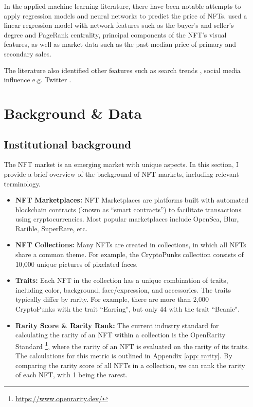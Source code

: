 \documentclass[12pt]{article}
\begin{document}
In the applied machine learning literature, there have been notable attempts to apply regression models and neural networks to predict the price of NFTs. \citet{nadini2021mapping} used a linear regression model with network features such as the buyer's and seller's degree and PageRank centrality, principal components of the NFT's visual features, as well as market data such as the past median price of primary and secondary sales.

The literature also identified other features such as search trends \citep{jain2022nft,kaneko2021time}, social media influence e.g. Twitter \citep{kapoor2022tweetboost}.


\section{Background \& Data}
\label{sec: data}

\subsection{Institutional background}
The NFT market is an emerging market with unique aspects. In this section, I provide a brief overview of the background of NFT markets, including relevant terminology.

\begin{itemize}

    \item \textbf{NFT Marketplaces:} NFT Marketplaces are platforms built with automated blockchain contracts (known as ``smart contracts'') to facilitate transactions using cryptocurrencies. Most popular marketplaces include OpenSea, Blur, Rarible, SuperRare, etc. 

    \item \textbf{NFT Collections:} Many NFTs are created in collections, in which all NFTs share a common theme. For example, the CryptoPunks collection consists of 10,000 unique pictures of pixelated faces. 

    \item \textbf{Traits:} Each NFT in the collection has a unique combination of traits, including color, background, face/expression, and accessories. The traits typically differ by rarity. For example, there are more than 2,000 CryptoPunks with the trait ``Earring", but only 44 with the trait ``Beanie".
    
    \item \textbf{Rarity Score \& Rarity Rank: } The current industry standard for calculating the rarity of an NFT within a collection is the OpenRarity Standard \footnote{\url{https://www.openrarity.dev/}}, where the rarity of an NFT is evaluated on the rarity of its traits. The calculations for this metric is outlined in Appendix \ref{app: rarity}. By comparing the rarity score of all NFTs in a collection, we can rank the rarity of each NFT, with 1 being the rarest.
\end{itemize}
\end{document}
